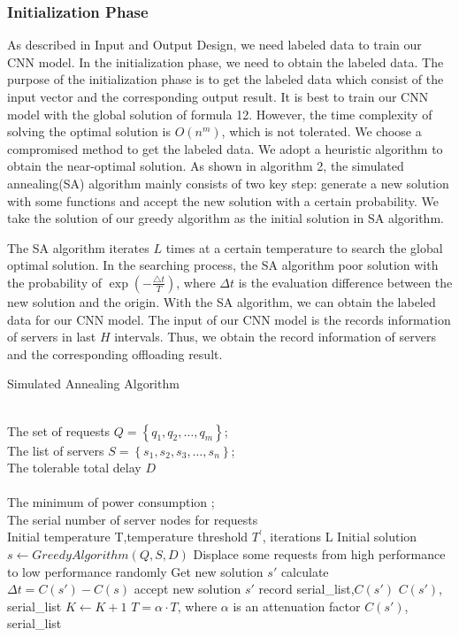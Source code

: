 \documentclass[twoside,twocolumn]{article}
\begin{document}
\subsubsection{Initialization Phase}
As described in Input and Output Design, we need labeled data to train our CNN model. In the initialization phase, we need to obtain the labeled data. The purpose of the initialization phase is to get the labeled data which consist of the input vector and the corresponding output result. It is best to train our CNN model with the global solution of formula 12. However, the time complexity of solving the optimal solution is $O(n^m)$, which is not tolerated. We choose a compromised method to get the labeled data. We adopt a heuristic algorithm to obtain the near-optimal solution.  As shown in algorithm 2, the simulated annealing(SA) algorithm mainly consists of two key step: generate a new solution with some functions and accept the new solution with a certain probability. We take the solution of our greedy algorithm as the initial solution in SA algorithm.

The SA algorithm iterates $L$ times at a certain temperature to search the global optimal solution. In the searching process, the SA algorithm poor solution with the probability of $\exp(-\frac{\triangle t}{T})$, where $\Delta t$ is the evaluation difference between the new solution and the origin. With the SA algorithm, we can obtain the labeled data for our CNN model. The input of our CNN model is the records information of servers in last $H$ intervals. Thus, we obtain the record information of servers and the corresponding offloading result.

\begin{algorithm}[!h]   
\caption{Simulated Annealing Algorithm}   
\label{alg:Framwork}   
\begin{algorithmic}[1]
\REQUIRE ~~\\ %
The set of requests  $\mathit{Q}=\left\{q_1,q_2,\dots,q_m \right\} $;\\  
The list of servers $S=\left\{s_1,s_2,s_3,\dots,s_n \right\}$;\\ 
The tolerable total delay $D$ \\
\ENSURE ~~\\
The minimum of power consumption ;\\
The serial number of server nodes for requests \\ 
\STATE Initial temperature T,temperature threshold $T^{'}$, iterations L
\STATE Initial solution\\ $s \leftarrow Greedy  Algorithm(Q,S,D)$
\REPEAT
\STATE  Displace some requests from high performance to low performance randomly
\STATE Get new solution $s'$
\ENDIF
\STATE calculate $\Delta t = C(s')-C(s)$
\STATE accept new solution $s'$
\STATE record serial\_list,$C(s')$
\ENDIF
{}
\RETURN $C(s')$, serial\_list
\ENDIF
\STATE$K \leftarrow K+1$
\STATE $T = \alpha\cdot T$, where $\alpha$ is an attenuation factor
\ENDWHILE
\RETURN $C(s')$, serial\_list
\end{algorithmic}  
\end{algorithm}  
\end{document}
